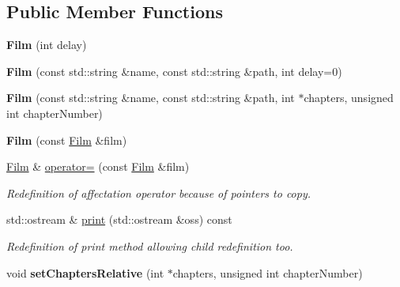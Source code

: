 \subsection*{Public Member Functions}
\begin{DoxyCompactItemize}
\item 
\hypertarget{class_film_a7a13b286528330495b2b7bc5b2a2214c}{{\bfseries Film} (int delay)}\label{class_film_a7a13b286528330495b2b7bc5b2a2214c}

\item 
\hypertarget{class_film_a3fad6e511f2e1933d8a3a7507c55aba9}{{\bfseries Film} (const std\-::string \&name, const std\-::string \&path, int delay=0)}\label{class_film_a3fad6e511f2e1933d8a3a7507c55aba9}

\item 
\hypertarget{class_film_ab364efe0650fb42f68373976e6cdae8d}{{\bfseries Film} (const std\-::string \&name, const std\-::string \&path, int $\ast$chapters, unsigned int chapter\-Number)}\label{class_film_ab364efe0650fb42f68373976e6cdae8d}

\item 
\hypertarget{class_film_a55720d8df910ce4094dde2625a091c82}{{\bfseries Film} (const \hyperlink{class_film}{Film} \&film)}\label{class_film_a55720d8df910ce4094dde2625a091c82}

\item 
\hypertarget{class_film_aa0c06810ba54f8ad9cf458dc8a0f4e19}{\hyperlink{class_film}{Film} \& \hyperlink{class_film_aa0c06810ba54f8ad9cf458dc8a0f4e19}{operator=} (const \hyperlink{class_film}{Film} \&film)}\label{class_film_aa0c06810ba54f8ad9cf458dc8a0f4e19}

\begin{DoxyCompactList}\small\item\em Redefinition of affectation operator because of pointers to copy. \end{DoxyCompactList}\item 
\hypertarget{class_film_ab1bee96f2a09e9bc0dfa548ea71f035d}{std\-::ostream \& \hyperlink{class_film_ab1bee96f2a09e9bc0dfa548ea71f035d}{print} (std\-::ostream \&oss) const }\label{class_film_ab1bee96f2a09e9bc0dfa548ea71f035d}

\begin{DoxyCompactList}\small\item\em Redefinition of print method allowing child redefinition too. \end{DoxyCompactList}\item 
\hypertarget{class_film_a9c7dee0ed9415d83ef9fe95f59961c80}{void {\bfseries set\-Chapters\-Relative} (int $\ast$chapters, unsigned int chapter\-Number)}\label{class_film_a9c7dee0ed9415d83ef9fe95f59961c80}


\end{DoxyCompactItemize}
